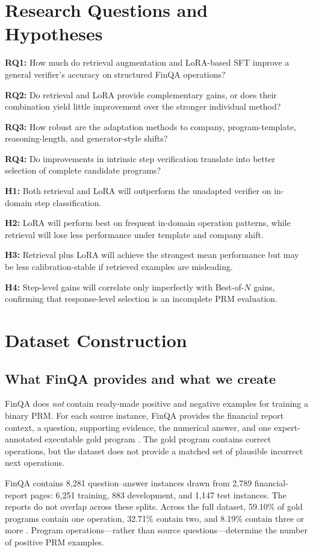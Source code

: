 \documentclass[10pt,twocolumn]{article}
\begin{document}
\section{Research Questions and Hypotheses}
\textbf{RQ1:} How much do retrieval augmentation and LoRA-based SFT improve a general verifier's accuracy on structured FinQA operations?

\textbf{RQ2:} Do retrieval and LoRA provide complementary gains, or does their combination yield little improvement over the stronger individual method?

\textbf{RQ3:} How robust are the adaptation methods to company, program-template, reasoning-length, and generator-style shifts?

\textbf{RQ4:} Do improvements in intrinsic step verification translate into better selection of complete candidate programs?

\textbf{H1:} Both retrieval and LoRA will outperform the unadapted verifier on in-domain step classification.

\textbf{H2:} LoRA will perform best on frequent in-domain operation patterns, while retrieval will lose less performance under template and company shift.

\textbf{H3:} Retrieval plus LoRA will achieve the strongest mean performance but may be less calibration-stable if retrieved examples are misleading.

\textbf{H4:} Step-level gains will correlate only imperfectly with Best-of-$N$ gains, confirming that response-level selection is an incomplete PRM evaluation.

\section{Dataset Construction}
\subsection{What FinQA provides and what we create}
FinQA does \emph{not} contain ready-made positive and negative examples for training a binary PRM. For each source instance, FinQA provides the financial report context, a question, supporting evidence, the numerical answer, and one expert-annotated executable gold program \citep{finqa2021}. The gold program contains correct operations, but the dataset does not provide a matched set of plausible incorrect next operations.

FinQA contains 8,281 question--answer instances drawn from 2,789 financial-report pages: 6,251 training, 883 development, and 1,147 test instances. The reports do not overlap across these splits. Across the full dataset, 59.10\% of gold programs contain one operation, 32.71\% contain two, and 8.19\% contain three or more \citep{finqa2021}. Program operations---rather than source questions---determine the number of positive PRM examples.
\end{document}
